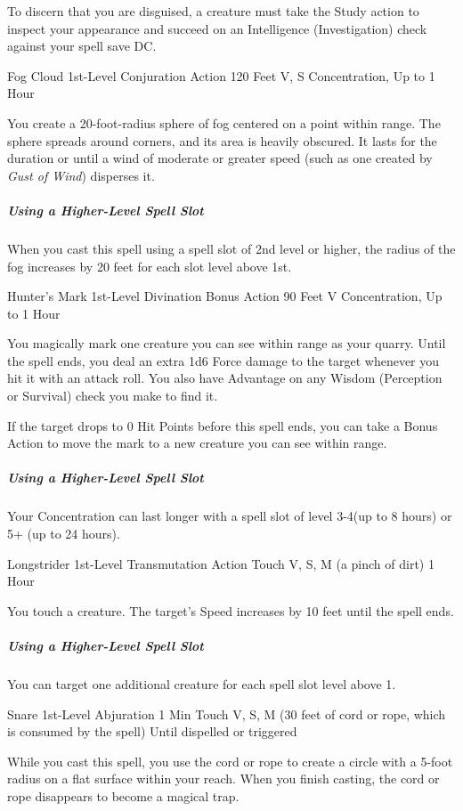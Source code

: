 \documentclass[letterpaper,openany,oneside,twocolumn]{book}
\begin{document}
To discern that you are disguised, a creature must take the Study action to inspect your appearance and succeed on an Intelligence (Investigation) check against your spell save DC.

\DndSpellHeader
  {Fog Cloud}
  {1st-Level Conjuration}
  {Action}
  {120 Feet}
  {V, S}
  {Concentration, Up to 1 Hour}

You create a 20-foot-radius sphere of fog centered on a point within range. The sphere spreads around corners, and its area is heavily obscured. It lasts for the duration or until a wind of moderate or greater speed (such as one created by \textit{Gust of Wind}) disperses it.

\subparagraph*{Using a Higher-Level Spell Slot} When you cast this spell using a spell slot of 2nd level or higher, the radius of the fog increases by 20 feet for each slot level above 1st.

\DndSpellHeader
  {Hunter's Mark}
  {1st-Level Divination}
  {Bonus Action}
  {90 Feet}
  {V}
  {Concentration, Up to 1 Hour}

You magically mark one creature you can see within range as your quarry. Until the spell ends, you deal an extra 1d6 Force damage to the target whenever you hit it with an attack roll. You also have Advantage on any Wisdom (Perception or Survival) check you make to find it.

If the target drops to 0 Hit Points before this spell ends, you can take a Bonus Action to move the mark to a new creature you can see within range.

\subparagraph*{Using a Higher-Level Spell Slot} Your Concentration can last longer with a spell slot of level 3-4(up to 8 hours) or 5+ (up to 24 hours).

\DndSpellHeader
  {Longstrider}
  {1st-Level Transmutation}
  {Action}
  {Touch}
  {V, S, M (a pinch of dirt)}
  {1 Hour}

You touch a creature. The target's Speed increases by 10 feet until the spell ends.

\subparagraph*{Using a Higher-Level Spell Slot} You can target one additional creature for each spell slot level above 1.

\DndSpellHeader
  {Snare}
  {1st-Level Abjuration}
  {1 Min}
  {Touch}
  {V, S, M (30 feet of cord or rope, which is consumed by the spell)}
  {Until dispelled or triggered}

While you cast this spell, you use the cord or rope to create a circle with a 5-foot radius on a flat surface within your reach. When you finish casting, the cord or rope disappears to become a magical trap.
\end{document}
